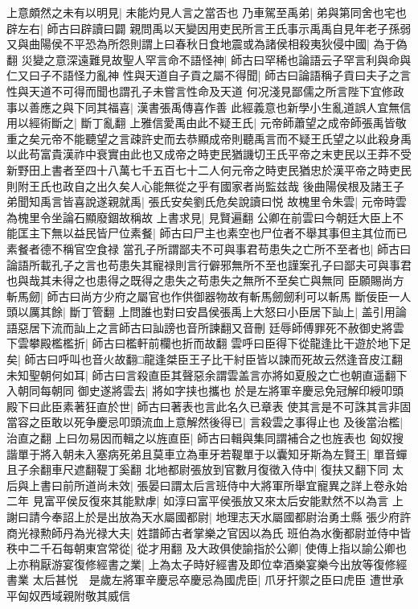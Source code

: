 上意頗然之未有以明見|{
	未能灼見人言之當否也}
乃車駕至禹弟|{
	弟與第同舍也宅也}
辟左右|{
	師古曰辟讀曰闢}
親問禹以天變因用吏民所言王氏事示禹禹自見年老子孫弱又與曲陽侯不平恐為所怨則謂上曰春秋日食地震或為諸侯相殺夷狄侵中國|{
	為于偽翻}
災變之意深遠難見故聖人罕言命不語怪神|{
	師古曰罕稀也論語云子罕言利與命與仁又曰子不語怪力亂神}
性與天道自子貢之屬不得聞|{
	師古曰論語稱子貢曰夫子之言性與天道不可得而聞也謂孔子未嘗言性命及天道}
何况淺見鄙儒之所言陛下宜修政事以善應之與下同其福喜|{
	漢書張禹傳喜作善}
此經義意也新學小生亂道誤人宜無信用以經術斷之|{
	斷丁亂翻}
上雅信愛禹由此不疑王氏|{
	元帝師蕭望之成帝師張禹皆敬重之矣元帝不能聽望之言疎許史而去恭顯成帝則聽禹言而不疑王氏望之以此殺身禹以此苟富貴漢祚中衰實由此也又成帝之時吏民猶譏切王氏平帝之末吏民以王莽不受新野田上書者至四十八萬七千五百七十二人何元帝之時吏民猶忠於漢平帝之時吏民則附王氏也政自之出久矣人心能無從之乎有國家者尚監兹哉}
後曲陽侯根及諸王子弟聞知禹言皆喜說遂親就禹|{
	張氏安矣劉氏危矣說讀曰悦}
故槐里令朱雲|{
	元帝時雲為槐里令坐論石顯廢錮故稱故}
上書求見|{
	見賢遍翻}
公卿在前雲曰今朝廷大臣上不能匡主下無以益民皆尸位素餐|{
	師古曰尸主也素空也尸位者不舉其事但主其位而已素餐者德不稱官空食禄}
當孔子所謂鄙夫不可與事君苟患失之亡所不至者也|{
	師古曰論語所載孔子之言也苟患失其寵禄則言行僻邪無所不至也謹案孔子曰鄙夫可與事君也與哉其未得之也患得之既得之患失之苟患失之無所不至矣亡與無同}
臣願賜尚方斬馬劒|{
	師古曰尚方少府之屬官也作供御器物故有斬馬劒劒利可以斬馬}
斷佞臣一人頭以厲其餘|{
	斷丁管翻}
上問誰也對曰安昌侯張禹上大怒曰小臣居下訕上|{
	盖引用論語惡居下流而訕上之言師古曰訕謗也音所諫翻又音刪}
廷辱師傅罪死不赦御史將雲下雲攀殿檻檻折|{
	師古曰檻軒前欄也折而故翻}
雲呼曰臣得下從龍逢比干遊於地下足矣|{
	師古曰呼叫也音火故翻□龍逢桀臣王子比干紂臣皆以諫而死故云然逢音皮江翻}
未知聖朝何如耳|{
	師古曰言殺直臣其聲惡余謂雲盖言亦將如夏殷之亡也朝直遥翻下入朝同每朝同}
御史遂將雲去|{
	將如字挟也攜也}
於是左將軍辛慶忌免冠解印綬叩頭殿下曰此臣素著狂直於世|{
	師古曰著表也言此名久已章表}
使其言是不可誅其言非固當容之臣敢以死争慶忌叩頭流血上意解然後得已|{
	言殺雲之事得止也}
及後當治檻|{
	治直之翻}
上曰勿易因而輯之以旌直臣|{
	師古曰輯與集同謂補合之也旌表也}
匈奴搜諧單于將入朝未入塞病死弟且莫車立為車牙若鞮單于以囊知牙斯為左賢王|{
	單音蟬且子余翻車尺遮翻鞮丁奚翻}
北地都尉張放到官數月復徵入侍中|{
	復扶又翻下同}
太后與上書曰前所道尚未效|{
	張晏曰謂太后言班侍中大將軍所舉宜寵異之詳上卷永始二年}
見富平侯反復來其能默虖|{
	如淳曰富平侯張放又來太后安能默然不以為言}
上謝曰請今奉詔上於是出放為天水屬國都尉|{
	地理志天水屬國都尉治勇土縣}
張少府許商光禄勲師丹為光禄大夫|{
	姓譜師古者掌樂之官因以為氏}
班伯為水衡都尉並侍中皆秩中二千石每朝東宫常從|{
	從才用翻}
及大政俱使諭指於公卿|{
	使傳上指以諭公卿也}
上亦稍厭游宴復修經書之業|{
	上為太子時好經書及即位幸酒樂宴樂今出放等復修經書業}
太后甚悦　是歲左將軍辛慶忌卒慶忌為國虎臣|{
	爪牙扞禦之臣曰虎臣}
遭世承平匈奴西域親附敬其威信

